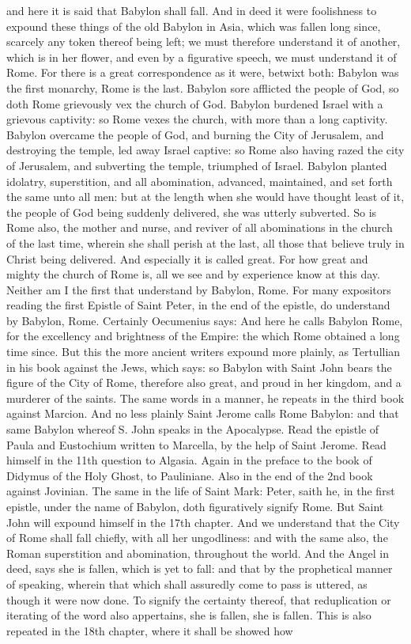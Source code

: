 and here it is said that Babylon shall fall. And in deed it were foolishness to expound these things of the old Babylon in Asia, which was fallen long since, scarcely any token thereof being left; we must therefore understand it of another, which is in her flower, and even by a figurative speech, we must understand it of Rome. For there is a great correspondence as it were, betwixt both: Babylon was the first monarchy, Rome is the last. Babylon sore afflicted the people of God, so doth Rome grievously vex the church of God. Babylon burdened Israel with a grievous captivity: so Rome vexes the church, with more than a long captivity. Babylon overcame the people of God, and burning the City of Jerusalem, and destroying the temple, led away Israel captive: so Rome also having razed the city of Jerusalem, and subverting the temple, triumphed of Israel. Babylon planted idolatry, superstition, and all abomination, advanced, maintained, and set forth the same unto all men: but at the length when she would have thought least of it, the people of God being suddenly delivered, she was utterly subverted. So is Rome also, the mother and nurse, and reviver of all abominations in the church of the last time, wherein she shall perish at the last, all those that believe truly in Christ being delivered. And especially it is called great. For how great and mighty the church of Rome is, all we see and by experience know at this day. Neither am I the first that understand by Babylon, Rome. For many expositors reading the first Epistle of Saint Peter, in the end of the epistle, do understand by Babylon, Rome. Certainly Oecumenius says: And here he calls Babylon Rome, for the excellency and brightness of the Empire: the which Rome obtained a long time since. But this the more ancient writers expound more plainly, as Tertullian in his book against the Jews, which says: so Babylon with Saint John bears the figure of the City of Rome, therefore also great, and proud in her kingdom, and a murderer of the saints. The same words in a manner, he repeats in the third book against Marcion. And no less plainly Saint Jerome calls Rome Babylon: and that same Babylon whereof S. John speaks in the Apocalypse. Read the epistle of Paula and Eustochium written to Marcella, by the help of Saint Jerome. Read himself in the 11th question to Algasia. Again in the preface to the book of Didymus of the Holy Ghost, to Pauliniane. Also in the end of the 2nd book against Jovinian. The same in the life of Saint Mark: Peter, saith he, in the first epistle, under the name of Babylon, doth figuratively signify Rome. But Saint John will expound himself in the 17th chapter. And we understand that the City of Rome shall fall chiefly, with all her ungodliness: and with the same also, the Roman superstition and abomination, throughout the world. And the Angel in deed, says she is fallen, which is yet to fall: and that by the prophetical manner of speaking, wherein that which shall assuredly come to pass is uttered, as though it were now done. To signify the certainty thereof, that reduplication or iterating of the word also appertains, she is fallen, she is fallen. This is also repeated in the 18th chapter, where it shall be showed how 
